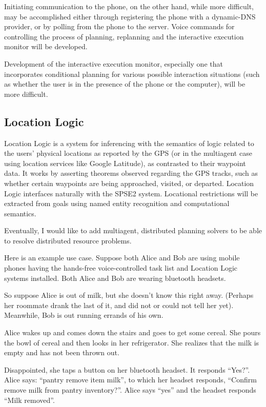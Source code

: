 \documentclass[letterpaper]{article}
\begin{document}
Initiating communication to the phone, on the other hand, while more
difficult, may be accomplished either through registering the phone
with a dynamic-DNS provider, or by polling from the phone to the
server.  Voice commands for controlling the process of planning,
replanning and the interactive execution monitor will be developed.

Development of the interactive execution monitor, especially one that
incorporates conditional planning for various possible interaction
situations (such as whether the user is in the presence of the phone
or the computer), will be more difficult.

\subsection{Location Logic}

\noindent Location Logic is a system for inferencing with the
semantics of logic related to the users' physical locations as
reported by the GPS (or in the multiagent case using location services
like Google Latitude), as contrasted to their waypoint data.  It works
by asserting theorems observed regarding the GPS tracks, such as
whether certain waypoints are being approached, visited, or departed.
Location Logic interfaces naturally with the SPSE2 system.  Locational
restrictions will be extracted from goals using named entity
recognition and computational semantics.

Eventually, I would like to add multiagent, distributed planning
solvers to be able to resolve distributed resource problems.

Here is an example use case.  Suppose both Alice and Bob are using
mobile phones having the hands-free voice-controlled task list and
Location Logic systems installed.  Both Alice and Bob are wearing
bluetooth headsets.

So suppose Alice is out of milk, but she doesn't know this right away.
(Perhaps her roommate drank the last of it, and did not or could not
tell her yet).  Meanwhile, Bob is out running errands of his own.

Alice wakes up and comes down the stairs and goes to get some cereal.
She pours the bowl of cereal and then looks in her refrigerator.  She
realizes that the milk is empty and has not been thrown out.

Disappointed, she taps a button on her bluetooth headset.  It responds
``Yes?''.  Alice says: ``pantry remove item milk'', to which her
headset responds, ``Confirm remove milk from pantry inventory?''.
Alice says ``yes'' and the headset responds ``Milk removed''.
\end{document}
